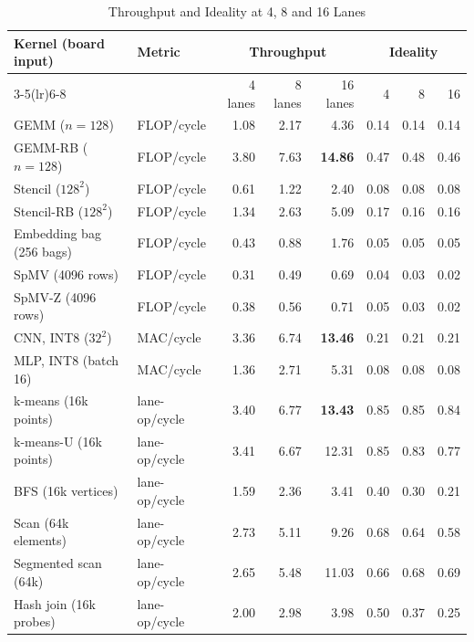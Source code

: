 \begin{table}[t]
\caption{Throughput and Ideality at 4, 8 and 16 Lanes}
\label{tab:lanes_tp}
\centering\footnotesize
\setlength{\tabcolsep}{4.5pt}
\begin{tabular}{llrrrrrr}
\toprule
Kernel (board input) & Metric & \multicolumn{3}{c}{Throughput} & \multicolumn{3}{c}{Ideality}\\
\cmidrule(lr){3-5}\cmidrule(lr){6-8}
 & & 4 lanes & 8 lanes & 16 lanes & 4 & 8 & 16\\
\midrule
GEMM ($n=128$)             & FLOP/cycle    & 1.08 & 2.17 & 4.36           & 0.14 & 0.14 & 0.14\\
GEMM-RB ($n=128$)          & FLOP/cycle    & 3.80 & 7.63 & \textbf{14.86} & 0.47 & 0.48 & 0.46\\
Stencil ($128^2$)          & FLOP/cycle    & 0.61 & 1.22 & 2.40           & 0.08 & 0.08 & 0.08\\
Stencil-RB ($128^2$)       & FLOP/cycle    & 1.34 & 2.63 & 5.09           & 0.17 & 0.16 & 0.16\\
Embedding bag (256 bags)   & FLOP/cycle    & 0.43 & 0.88 & 1.76           & 0.05 & 0.05 & 0.05\\
SpMV (4096 rows)           & FLOP/cycle    & 0.31 & 0.49 & 0.69           & 0.04 & 0.03 & 0.02\\
SpMV-Z (4096 rows)         & FLOP/cycle    & 0.38 & 0.56 & 0.71           & 0.05 & 0.03 & 0.02\\
CNN, INT8 ($32^2$)         & MAC/cycle     & 3.36 & 6.74 & \textbf{13.46} & 0.21 & 0.21 & 0.21\\
MLP, INT8 (batch 16)       & MAC/cycle     & 1.36 & 2.71 & 5.31           & 0.08 & 0.08 & 0.08\\
k-means (16k points)       & lane-op/cycle & 3.40 & 6.77 & \textbf{13.43} & 0.85 & 0.85 & 0.84\\
k-means-U (16k points)     & lane-op/cycle & 3.41 & 6.67 & 12.31          & 0.85 & 0.83 & 0.77\\
BFS (16k vertices)         & lane-op/cycle & 1.59 & 2.36 & 3.41           & 0.40 & 0.30 & 0.21\\
Scan (64k elements)        & lane-op/cycle & 2.73 & 5.11 & 9.26           & 0.68 & 0.64 & 0.58\\
Segmented scan (64k)       & lane-op/cycle & 2.65 & 5.48 & 11.03          & 0.66 & 0.68 & 0.69\\
Hash join (16k probes)     & lane-op/cycle & 2.00 & 2.98 & 3.98           & 0.50 & 0.37 & 0.25\\
\bottomrule
\end{tabular}

\end{table}

